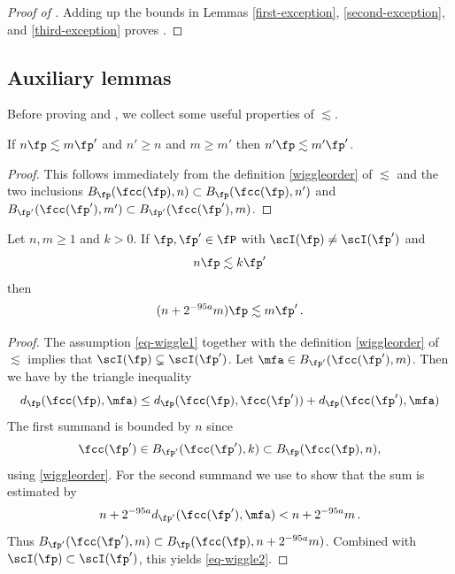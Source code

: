 \begin{proof}[Proof of ]
    \leanok
Adding up the bounds in Lemmas \ref{first-exception}, \ref{second-exception}, and \ref{third-exception} proves .
\end{proof}


\subsection{Auxiliary lemmas}
\label{subsec-lessim-aux}
Before proving  and , we collect some useful properties of $\lesssim$.

\begin{lemma}
    \label{wiggle-order-1}
    \leanok
    If $n\fp \lesssim m\fp'$ and
    $n' \ge n$ and $m \ge m'$ then $n'\fp \lesssim m'\fp'$.
\end{lemma}

\begin{proof}
    \leanok
    This follows immediately from the definition \eqref{wiggleorder} of $\lesssim$ and the two inclusions $B_{\fp}(\fcc(\fp), n) \subset B_{\fp}(\fcc(\fp), n')$ and $B_{\fp'}(\fcc(\fp'), m') \subset B_{\fp'}(\fcc(\fp'), m)$.
\end{proof}

\begin{lemma}
    \label{wiggle-order-2}
    \leanok

    Let $n, m \ge 1$ and $k > 0$.
    If $\fp, \fp' \in \fP$ with $\scI(\fp) \ne \scI(\fp')$ and
    \begin{equation}
        \label{eq-wiggle1}
        n \fp \lesssim k \fp'
    \end{equation}
    then
    \begin{equation}
        \label{eq-wiggle2}
        (n + 2^{-95 a} m) \fp \lesssim m\fp'\,.
    \end{equation}
\end{lemma}

\begin{proof}
    \leanok
    The assumption \eqref{eq-wiggle1} together with the definition \eqref{wiggleorder} of $\lesssim$ implies that $\scI(\fp) \subsetneq \scI(\fp')$. Let $\mfa \in B_{\fp'}(\fcc(\fp'), m)$. Then we have by the triangle inequality
    $$
        d_{\fp}(\fcc(\fp), \mfa) \le d_{\fp}(\fcc(\fp), \fcc(\fp')) + d_{\fp}(\fcc(\fp'), \mfa)
    $$
    The first summand is bounded by $n$ since
    $$
        \fcc(\fp') \in B_{\fp'}(\fcc(\fp'), k) \subset B_{\fp}(\fcc(\fp), n),
    $$
    using \eqref{wiggleorder}. For the second summand we use 
    to show that the sum is estimated by
    $$
        n + 2^{-95a} d_{\fp'}(\fcc(\fp'), \mfa) < n + 2^{-95a} m\,.
    $$
    Thus $B_{\fp'}(\fcc(\fp'),m) \subset B_{\fp}(\fcc(\fp),n + 2^{-95a}m)$. Combined with $\scI(\fp) \subset \scI(\fp')$, this yields \eqref{eq-wiggle2}.
\end{proof}

